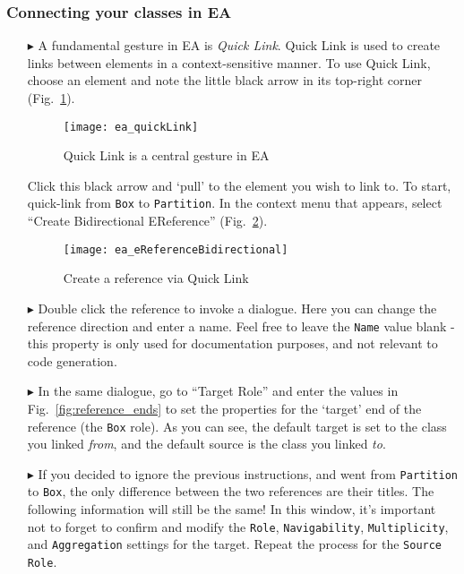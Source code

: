 \newpage
\subsubsection{Connecting your classes in EA}
\visHeader
\hypertarget{static:references vis}{}

\begin{itemize}

\item[$\blacktriangleright$] A fundamental gesture in EA is \emph{Quick Link}. Quick Link is used to create links between elements in a context-sensitive
manner. To use Quick Link, choose an element and note the little black arrow in its top-right corner (Fig.~\ref{fig:quicklink}).

\begin{figure}[htbp]
	\centering
  \texttt{[image: ea\_quickLink]}
	\caption{Quick Link is a central gesture in EA}
	\label{fig:quicklink}
\end{figure}
\FloatBarrier

Click this black arrow and `pull' to the element you wish to link to. To start, quick-link from \texttt{Box} to \texttt{Partition}. In the context menu
that appears, select ``Create Bidirectional EReference'' (Fig.~\ref{fig:ereference}).

\begin{figure}[htbp]
	\centering
  \texttt{[image: ea\_eReferenceBidirectional]}
	\caption{Create a reference via Quick Link}
	\label{fig:ereference}
\end{figure}
\FloatBarrier

\item[$\blacktriangleright$] Double click the reference to invoke a dialogue. Here you can change the reference direction and enter a name. Feel free to leave
the \texttt{Name} value blank - this property is only used for documentation purposes, and not relevant to code generation.

\item[$\blacktriangleright$] In the same dialogue, go to ``Target Role'' and enter the values in Fig.~\ref{fig:reference_ends} to set the properties for the
`target' end of the reference (the \texttt{Box} role). As you can see, the default target is set to the class you linked \emph{from}, and the default source is
the class you linked \emph{to}. 

\vspace{0.5cm}

\item[$\blacktriangleright$] If you decided to ignore the previous instructions, and went from \texttt{Partition} to \texttt{Box}, the only difference between
the two references are their titles. The following information will still be the same! In this window, it's important not to forget to confirm and modify the
\texttt{Role}, \texttt{Navigability}, \texttt{Multiplicity}, and \texttt{Aggregation} settings for the target.  Repeat the process for the \texttt{Source Role}.


\end{itemize}
